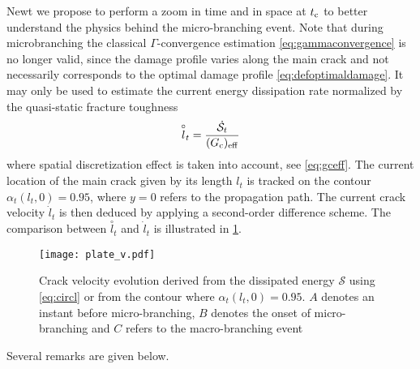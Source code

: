 Newt we propose to perform a zoom in time and in space at $t_{\mathrm{c}}$ to better understand the physics behind the micro-branching event. Note that during microbranching the classical $\Gamma$-convergence estimation \eqref{eq:gammaconvergence} is no longer valid, since the damage profile varies along the main crack and not necessarily corresponds to the optimal damage profile \eqref{eq:defoptimaldamage}. It may only be used to estimate the current energy dissipation rate normalized by the quasi-static fracture toughness
\begin{equation} \label{eq:circl}
\overset{\circ}{l}_t=\frac{\dot{\mathcal{S}}_t}{(G_\mathrm{c})_\mathrm{eff}}
\end{equation}
where spatial discretization effect is taken into account, see \eqref{eq:gceff}. The current location of the main crack given by its length $l_t$ is tracked on the contour $\alpha_t(l_t,0)=0.95$, where $y=0$ refers to the propagation path. The current crack velocity $\dot{l}_t$ is then deduced by applying a second-order difference scheme. The comparison between $\overset{\circ}{l}_t$ and $\dot{l}_t$ is illustrated in \cref{fig:plate-v}.
\begin{figure}[htbp]
\centering
\texttt{[image: plate\_v.pdf]}
\caption{Crack velocity evolution derived from the dissipated energy $\mathcal{S}$ using \eqref{eq:circl} or from the contour where $\alpha_t(l_t,0)=0.95$. $A$ denotes an instant before micro-branching, $B$ denotes the onset of micro-branching and $C$ refers to the macro-branching event} \label{fig:plate-v}
\end{figure}
Several remarks are given below.
